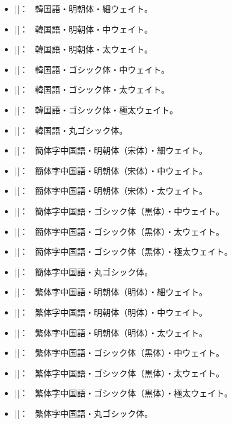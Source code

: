 \documentclass[uplatex,dvipdfmx,a4paper]{jsarticle}
\newcommand{\Means}{：\ }
\begin{document}
\begin{itemize}
\item |\setkoreanlightminchofont|\Means
      韓国語・明朝体・細ウェイト。
\item |\setkoreanmediumminchofont|\Means
      韓国語・明朝体・中ウェイト。
\item |\setkoreanboldminchofont|\Means
      韓国語・明朝体・太ウェイト。
\item |\setkoreanmediumgothicfont|\Means
      韓国語・ゴシック体・中ウェイト。
\item |\setkoreanboldgothicfont|\Means
      韓国語・ゴシック体・太ウェイト。
\item |\setkoreanxboldgothicfont|\Means
      韓国語・ゴシック体・極太ウェイト。
\item |\setkoreanmarugothicfont|\Means
      韓国語・丸ゴシック体。

\item |\setschineselightminchofont|\Means
      簡体字中国語・明朝体（宋体）・細ウェイト。
\item |\setschinesemediumminchofont|\Means
      簡体字中国語・明朝体（宋体）・中ウェイト。
\item |\setschineseboldminchofont|\Means
      簡体字中国語・明朝体（宋体）・太ウェイト。
\item |\setschinesemediumgothicfont|\Means
      簡体字中国語・ゴシック体（黒体）・中ウェイト。
\item |\setschineseboldgothicfont|\Means
      簡体字中国語・ゴシック体（黒体）・太ウェイト。
\item |\setschinesexboldgothicfont|\Means
      簡体字中国語・ゴシック体（黒体）・極太ウェイト。
\item |\setschinesegothicfont|\Means
      簡体字中国語・丸ゴシック体。

\item |\settchineselightminchofont|\Means
      繁体字中国語・明朝体（明体）・細ウェイト。
\item |\settchineseboldminchofont|\Means
      繁体字中国語・明朝体（明体）・中ウェイト。
\item |\settchinesexboldminchofont|\Means
      繁体字中国語・明朝体（明体）・太ウェイト。
\item |\settchinesemediumgothicfont|\Means
      繁体字中国語・ゴシック体（黒体）・中ウェイト。
\item |\settchineseboldgothicfont|\Means
      繁体字中国語・ゴシック体（黒体）・太ウェイト。
\item |\settchinesexboldgothicfont|\Means
      繁体字中国語・ゴシック体（黒体）・極太ウェイト。
\item |\settchinesegothicfont|\Means
      繁体字中国語・丸ゴシック体。
\end{itemize}
\end{document}
